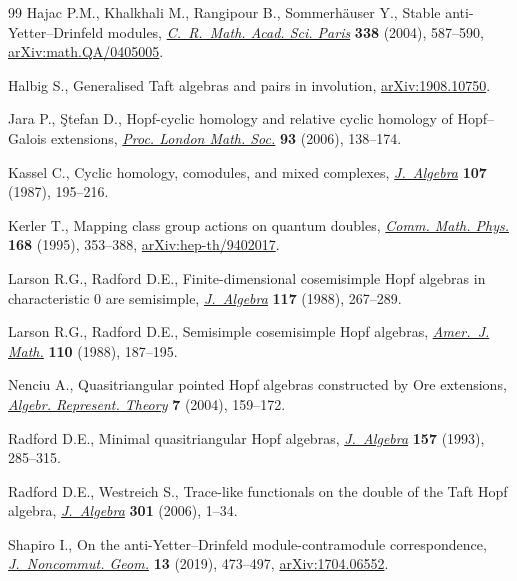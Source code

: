 \documentclass[10pt,a4paper]{amsart}
\numberwithin{equation}{section}
\begin{document}
\begin{thebibliography}{99}
Hajac P.M., Khalkhali M., Rangipour B., Sommerh\"auser Y., Stable
 anti-{Y}etter--{D}rinfeld modules, \href{https://doi.org/10.1016/j.crma.2003.11.037}{\textit{C.~R.~Math. Acad. Sci. Paris}}
 \textbf{338} (2004), 587--590, \href{https://arxiv.org/abs/math.QA/0405005}{arXiv:math.QA/0405005}.

Halbig S., Generalised {T}aft algebras and pairs in involution,
 \href{https://arxiv.org/abs/1908.10750}{arXiv:1908.10750}.

Jara P., \c{S}tefan D., Hopf-cyclic homology and relative cyclic homology of
 {H}opf--{G}alois extensions, \href{https://doi.org/10.1017/S0024611506015772}{\textit{Proc. London Math. Soc.}} \textbf{93}
 (2006), 138--174.

Kassel C., Cyclic homology, comodules, and mixed complexes, \href{https://doi.org/10.1016/0021-8693(87)90086-X}{\textit{J.~Algebra}}
 \textbf{107} (1987), 195--216.

Kerler T., Mapping class group actions on quantum doubles, \href{https://doi.org/10.1007/BF02101554}{\textit{Comm. Math.
 Phys.}} \textbf{168} (1995), 353--388, \href{https://arxiv.org/abs/hep-th/9402017}{arXiv:hep-th/9402017}.

Larson R.G., Radford D.E., Finite-dimensional cosemisimple {H}opf algebras in
 characteristic {$0$} are semisimple, \href{https://doi.org/10.1016/0021-8693(88)90107-X}{\textit{J.~Algebra}} \textbf{117} (1988),
 267--289.

Larson R.G., Radford D.E., Semisimple cosemisimple {H}opf algebras,
 \href{https://doi.org/10.2307/2374545}{\textit{Amer.~J. Math.}} \textbf{110} (1988), 187--195.

Nenciu A., Quasitriangular pointed {H}opf algebras constructed by {O}re
 extensions, \href{https://doi.org/10.1023/B:ALGE.0000026785.03997.60}{\textit{Algebr. Represent. Theory}} \textbf{7} (2004), 159--172.

Radford D.E., Minimal quasitriangular {H}opf algebras, \href{https://doi.org/10.1006/jabr.1993.1102}{\textit{J.~Algebra}}
 \textbf{157} (1993), 285--315.

Radford D.E., Westreich S., Trace-like functionals on the double of the {T}aft
 {H}opf algebra, \href{https://doi.org/10.1016/j.jalgebra.2004.04.023}{\textit{J.~Algebra}} \textbf{301} (2006), 1--34.

Shapiro I., On the anti-{Y}etter--{D}rinfeld module-contramodule
 correspondence, \href{https://doi.org/10.4171/JNCG/327}{\textit{J.~Noncommut. Geom.}} \textbf{13} (2019), 473--497,
 \href{https://arxiv.org/abs/1704.06552}{arXiv:1704.06552}.


\end{thebibliography}
\end{document}

